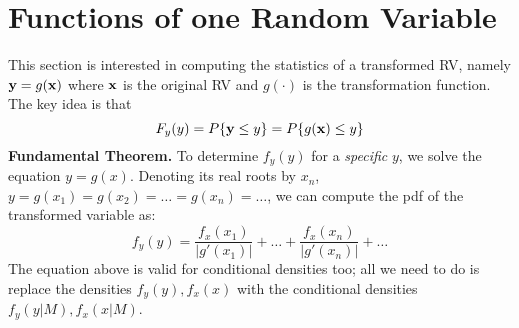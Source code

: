 \documentclass[a4paper, oneside]{book}
\begin{document}



\chapter{Functions of one Random Variable}

This section is interested in computing the statistics of a transformed RV, namely $\mathbf y = g(\mathbf x)$ where $\mathbf x$ is the original RV and $g(\cdot)$ is the transformation function. The key idea is that $$F_y(y) = P\{\mathbf{y} \le y\} = P\{g(\mathbf{x}) \le y\} $$
%
\textbf{Fundamental Theorem.} To determine $f_y(y)$ for a \textit{specific} $y$, we solve the equation $y=g(x)$. Denoting its real roots by $x_n$, \ie $y=g(x_1) = g(x_2) = \hdots = g(x_n) = \hdots$, we can compute the pdf of the transformed variable as: %
$$f_y(y) = \frac{f_x(x_1)}{|g'(x_1)|} + \hdots + \frac{f_x(x_n)}{|g'(x_n)|} + \hdots$$
%
The equation above is valid for conditional densities too; all we need to do is replace the densities $f_y(y), f_x(x)$ with the conditional densities $f_y(y|M), f_x(x|M)$.
\end{document}
